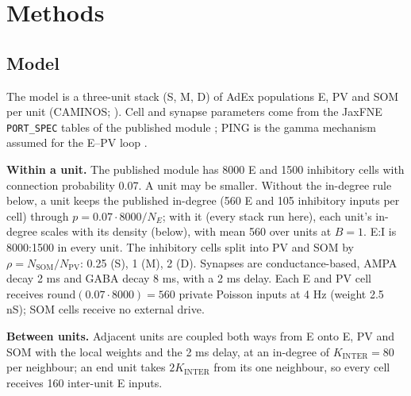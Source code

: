 \section{Methods}

\subsection{Model}

The model is a three-unit stack (S, M, D) of AdEx populations E, PV and SOM per unit (CAMINOS;
). Cell and synapse parameters come from the JaxFNE \texttt{PORT\_SPEC}
tables of the published module \citep{Tahvili2025,Tahvili2026}; PING is the gamma mechanism assumed for the E--PV
loop \citep{Borgers2003}.

\textbf{Within a unit.} The published module has 8000 E and 1500 inhibitory cells with connection probability
0.07. A unit may be smaller. Without the in-degree rule below, a unit keeps the published in-degree (560 E and 105
inhibitory inputs per cell) through $p = 0.07 \cdot 8000/N_E$; with it (every stack run here), each unit's in-degree
scales with its density (below), with mean 560 over units at $B = 1$. E:I is 8000:1500 in every unit. The inhibitory cells split into PV
and SOM by $\rho = N_\text{SOM}/N_\text{PV}$: 0.25 (S), 1 (M), 2 (D). Synapses are conductance-based, AMPA decay
2 ms and GABA decay 8 ms, with a 2 ms delay. Each E and PV cell receives $\text{round}(0.07 \cdot 8000) = 560$
private Poisson inputs at 4 Hz (weight 2.5 nS); SOM cells receive no external drive.

\textbf{Between units.} Adjacent units are coupled both ways from E onto E, PV and SOM with the local weights and
the 2 ms delay, at an in-degree of $K_\text{INTER} = 80$ per neighbour; an end unit takes $2K_\text{INTER}$ from its
one neighbour, so every cell receives 160 inter-unit E inputs.

